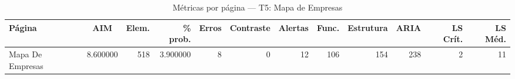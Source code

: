 \begin{table}[htbp]
  \centering
  \caption{Métricas por página — T5: Mapa de Empresas}
  \label{tab:flow_t5_mapa_de_empresas}
  \small
  \begin{tabular}{lcrrrrrrrrrr}
\toprule
Página & AIM & Elem. & \% prob. & Erros & Contraste & Alertas & Func. & Estrutura & ARIA & LS Crít. & LS Méd. \\
\midrule
Mapa De Empresas & 8.600000 & 518 & 3.900000 & 8 & 0 & 12 & 106 & 154 & 238 & 2 & 11 \\
\bottomrule
\end{tabular}
\end{table}
